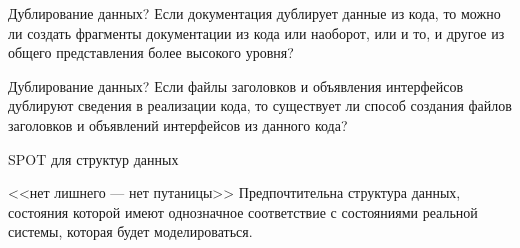 \begin{frame}{Дублирование данных?}
Если документация дублирует данные из кода,  то можно ли создать фрагменты документации 
из кода или наоборот,  или и то,  и другое из общего представления более высокого уровня?
\end{frame}

\begin{frame}{Дублирование данных?}
	Если файлы заголовков и объявления интерфейсов дублируют сведения в реализации кода,  
	то существует ли способ создания файлов заголовков и объявлений интерфейсов из данного кода?
\end{frame}

\begin{frame}{SPOT для структур данных}
	\begin{block}{<<нет лишнего — нет путаницы>>}
		Предпочтительна структура данных,  состояния которой имеют однозначное 
		соответствие с состояниями реальной системы,  которая будет моделироваться.
	\end{block}
\end{frame}




